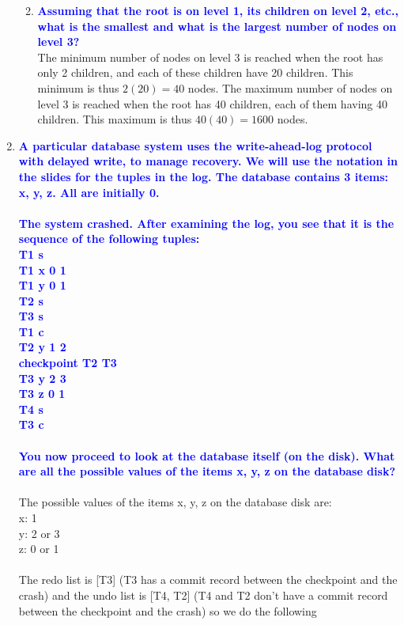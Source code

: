 \documentclass[10pt]{article}
\begin{document}
\begin{enumerate}
\begin{enumerate}
\begin{enumerate}
            \end{enumerate}        
        \item \textbf{\textcolor{blue}{Assuming that the root is on level 1, its children on level 2, etc., what is the smallest and what is the largest number of nodes on level 3?}}
            \\ The minimum number of nodes on level 3 is reached when the root has only 2 children, and each of these children have 20 children. This minimum is thus $2(20) = 40$ nodes. The maximum number of nodes on level 3 is reached when the root has 40 children, each of them having 40 children. This maximum is thus $40(40) = 1600$ nodes.
    \end{enumerate}

\item \textbf{\textcolor{blue}{A particular database system uses the write-ahead-log protocol with delayed write, to manage recovery. We will use the notation in the slides for the tuples in the log. The database contains 3 items: x, y, z. All are initially 0.
\\\\The system crashed. After examining the log, you see that it is the sequence of the following tuples:
\\ T1 s
\\ T1 x 0 1
\\ T1 y 0 1
\\ T2 s
\\ T3 s
\\ T1 c
\\ T2 y 1 2
\\ checkpoint T2 T3
\\ T3 y 2 3
\\ T3 z 0 1
\\ T4 s
\\ T3 c
\\\\ You now proceed to look at the database itself (on the disk). What are all the possible values of the items x, y, z on the database disk?}}
    \\\\ The possible values of the items x, y, z on the database disk are:
    \\ x: 1
    \\ y: 2 or 3
    \\ z: 0 or 1
    \\\\ The redo list is [T3] (T3 has a commit record between the checkpoint and the crash) and the undo list is [T4, T2] (T4 and T2 don't have a commit record between the checkpoint and the crash) so we do the following

\end{enumerate}
\end{document}
